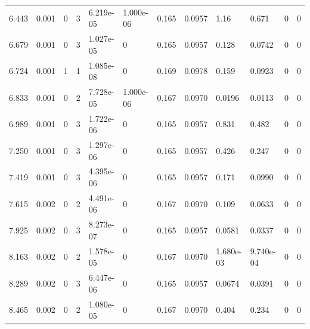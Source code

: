 \documentclass[preview]{standalone}
\begin{document}
{{\begin{tabular}{L{1.2cm}C{1.2cm} C{0.3cm}C{0.5cm} C{1.4cm}C{1.4cm} C{1.4cm}C{1.4cm} C{1.6cm}C{1.6cm} C{1.6cm}C{1.6cm}}
  6.443  &  0.001  & 0     &  3 &  6.219e-05  & 1.000e-06  &  0.165&   0.0957& 1.16 & 0.671   &  0 & 0  \\ 
  6.679  &  0.001  & 0     &  3 &  1.027e-05  & 0  &  0.165&   0.0957& 0.128 & 0.0742   &  0 & 0  \\ 
  6.724  &  0.001  & 1     &  1 &  1.085e-08  & 0  &  0.169&   0.0978& 0.159 & 0.0923   &  0 & 0  \\ 
  6.833  &  0.001  & 0     &  2 &  7.728e-05  & 1.000e-06  &  0.167&   0.0970& 0.0196 & 0.0113   &  0 & 0  \\ 
  6.989  &  0.001  & 0     &  3 &  1.722e-06  & 0  &  0.165&   0.0957& 0.831 & 0.482   &  0 & 0  \\ 
  7.250  &  0.001  & 0     &  3 &  1.297e-06  & 0  &  0.165&   0.0957& 0.426 & 0.247   &  0 & 0  \\ 
  7.419  &  0.001  & 0     &  3 &  4.395e-06  & 0  &  0.165&   0.0957& 0.171 & 0.0990   &  0 & 0  \\ 
  7.615  &  0.002  & 0     &  2 &  4.491e-06  & 0  &  0.167&   0.0970& 0.109 & 0.0633   &  0 & 0  \\ 
  7.925  &  0.002  & 0     &  3 &  8.273e-07  & 0  &  0.165&   0.0957& 0.0581 & 0.0337   &  0 & 0  \\ 
  8.163  &  0.002  & 0     &  2 &  1.578e-05  & 0  &  0.167&   0.0970& 1.680e-03 & 9.740e-04   &  0 & 0  \\ 
  8.289  &  0.002  & 0     &  3 &  6.447e-06  & 0  &  0.165&   0.0957& 0.0674 & 0.0391   &  0 & 0  \\ 
  8.465  &  0.002  & 0     &  2 &  1.080e-05  & 0  &  0.167&   0.0970& 0.404 & 0.234   &  0 & 0  \\ 
\hline 
\end{tabular} 

}}
\end{document}
